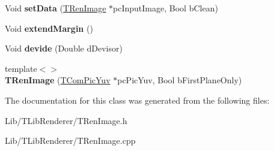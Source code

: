 \begin{DoxyCompactItemize}
\item 
\mbox{\label{class_t_ren_image_ac96feff30458673cf9c9b3a8c7c1e3ba}} 
Void {\bfseries set\+Data} (\hyperlink{class_t_ren_image}{T\+Ren\+Image} $\ast$pc\+Input\+Image, Bool b\+Clean)
\item 
\mbox{\label{class_t_ren_image_a60d5211d0ff0d1cef745898b25495786}} 
Void {\bfseries extend\+Margin} ()
\item 
\mbox{\label{class_t_ren_image_a29118294e1ae953e383828e73c994937}} 
Void {\bfseries devide} (Double d\+Devisor)
\item 
\mbox{\label{class_t_ren_image_a2c3b3e1000b8f27278db8c8a3f334473}} 
{\footnotesize template$<$$>$ }\\{\bfseries T\+Ren\+Image} (\hyperlink{class_t_com_pic_yuv}{T\+Com\+Pic\+Yuv} $\ast$pc\+Pic\+Yuv, Bool b\+First\+Plane\+Only)
\end{DoxyCompactItemize}


The documentation for this class was generated from the following files\+:\begin{DoxyCompactItemize}
\item 
Lib/\+T\+Lib\+Renderer/T\+Ren\+Image.\+h\item 
Lib/\+T\+Lib\+Renderer/T\+Ren\+Image.\+cpp\end{DoxyCompactItemize}
